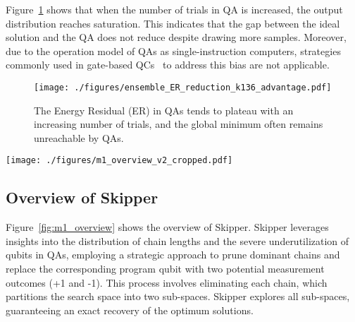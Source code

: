 Figure~\ref{fig:ER_plateau} shows that when the number of trials in QA is increased, the output distribution reaches saturation. 
This indicates that the gap between the ideal solution and the QA does not reduce despite drawing more samples.
Moreover, due to the operation model of QAs as single-instruction computers, strategies commonly used in gate-based QCs~\cite{tannu2019ensemble,patel2020veritas} to address this bias are not applicable.


\begin{figure}[h]    
    \centering
    \texttt{[image: ./figures/ensemble\_ER\_reduction\_k136\_advantage.pdf]}    
    \caption{        
        The Energy Residual (ER) in QAs tends to plateau with an increasing number of trials, and the global minimum often remains unreachable by QAs.
}    
    \label{fig:ER_plateau} 
\end{figure}  


\begin{figure*}[t]    
    \centering    
    \texttt{[image: ./figures/m1\_overview\_v2\_cropped.pdf]}
    \caption{
    Overview of Skipper. 
    }
    \label{fig:m1_overview} 
\end{figure*}   


\subsection{Overview of Skipper}

Figure~\ref{fig:m1_overview} shows the overview of Skipper. 
Skipper leverages insights into the distribution of chain lengths and the severe underutilization of qubits in QAs, employing a strategic approach to prune dominant chains and replace the corresponding program qubit with two potential measurement outcomes (+1 and -1). 
This process involves eliminating each chain, which partitions the search space into two sub-spaces. 
Skipper explores all sub-spaces, guaranteeing an exact recovery of the optimum solutions. 

